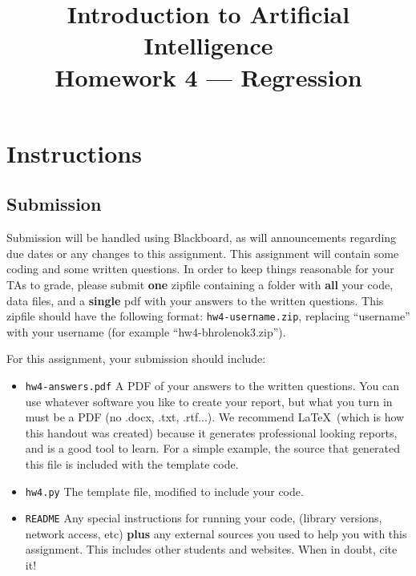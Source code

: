 \documentclass{article} %
\title{Introduction to Artificial Intelligence\\ %
Homework 4 --- Regression}
\date{} %
\author{}
\begin{document}
\maketitle %

\newcommand{\bphnote}[1]{\textit{\textcolor{red}{#1}}}


\section*{Instructions} %
\subsection*{Submission}
Submission will be handled using Blackboard, as will announcements regarding due dates or any changes to this assignment. 
This assignment will contain some coding and some written questions. In order to keep things reasonable for 
your TAs to grade, please submit \textbf{one} zipfile containing a folder with \textbf{all} your code, data files, and a 
\textbf{single} pdf with your answers to the written questions. This zipfile should have the following format: 
\texttt{hw4-username.zip}, replacing ``username'' with your username (for example ``hw4-bhrolenok3.zip'').

For this assignment, your submission should include:
\begin{itemize}
	\item \texttt{hw4-answers.pdf} A PDF of your answers to the written questions. You can use whatever software you like to create your report, but what you turn in must be a PDF (no .docx, .txt, .rtf...). We recommend \LaTeX~(which is how this handout was created) because it generates professional looking reports, and is a good tool to learn. For a simple example, the source that generated this file is included with the template code.
	\item \texttt{hw4.py} The template file, modified to include your code.
	\item \texttt{README} Any special instructions for running your code, (library versions, network access, etc) \textbf{plus}
	any external sources you used to help you with this assignment. This includes other students and websites. When in doubt, cite it!
\end{itemize}
\end{document}
